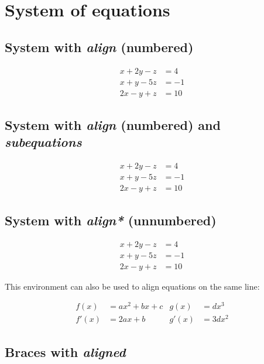 \documentclass{article}
\begin{document}
\section*{System of equations}

\subsection*{System with \emph{align} (numbered)}

\begin{align}
	x + 2y - z &= 4 \\
	x + y - 5z &= -1 \\
	2x - y + z &= 10
\end{align}

\subsection*{System with \emph{align} (numbered) and \emph{subequations}}

\begin{subequations}
	\begin{align}
		x + 2y - z &= 4 \\
		x + y - 5z &= -1 \\
		2x - y + z &= 10
	\end{align}
\end{subequations}


\subsection*{System with \emph{align*} (unnumbered)}

\begin{align*}
	x + 2y - z &= 4 \\
	x + y - 5z &= -1 \\
	2x - y + z &= 10
\end{align*}

This environment can also be used to align equations on the same line:

\begin{align*}
	 f(x)  &= a x^2+b x +c   &   g(x)  &= d x^3 \\
	 f'(x) &= 2 a x +b       &   g'(x) &= 3 d x^2
\end{align*}

\subsection*{Braces with \emph{aligned}}
\end{document}
